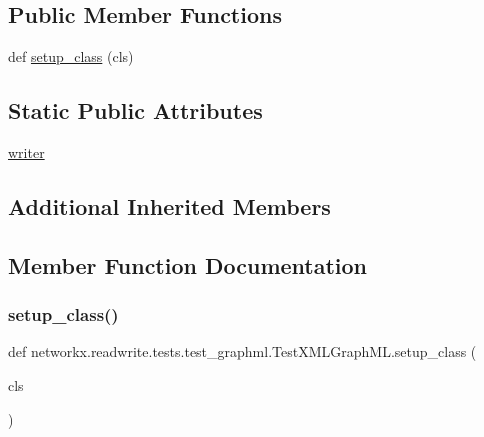 \subsection*{Public Member Functions}
\begin{DoxyCompactItemize}
\item 
def \hyperlink{classnetworkx_1_1readwrite_1_1tests_1_1test__graphml_1_1TestXMLGraphML_a2798c0694fbb7e7fed868eb665000f07}{setup\+\_\+class} (cls)
\end{DoxyCompactItemize}
\subsection*{Static Public Attributes}
\begin{DoxyCompactItemize}
\item 
\hyperlink{classnetworkx_1_1readwrite_1_1tests_1_1test__graphml_1_1TestXMLGraphML_ab6707111204d46d81c592b8523776424}{writer}
\end{DoxyCompactItemize}
\subsection*{Additional Inherited Members}


\subsection{Member Function Documentation}
\mbox{\label{classnetworkx_1_1readwrite_1_1tests_1_1test__graphml_1_1TestXMLGraphML_a2798c0694fbb7e7fed868eb665000f07}} 
\subsubsection{\texorpdfstring{setup\+\_\+class()}{setup\_class()}}
{\footnotesize\ttfamily def networkx.\+readwrite.\+tests.\+test\+\_\+graphml.\+Test\+X\+M\+L\+Graph\+M\+L.\+setup\+\_\+class (\begin{DoxyParamCaption}\item[{}]{cls }\end{DoxyParamCaption})}



